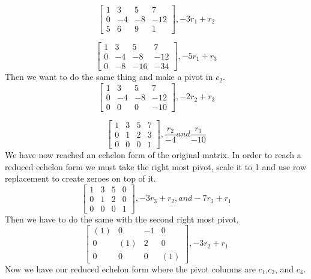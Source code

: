 \documentclass{amsart}
\begin{document}
\begin{equation}
\begin{bmatrix} 
1&3&5&7\\
0&-4&-8&-12\\
5&6&9&1
\end{bmatrix}, -3r_1+r_2
\end{equation}


\begin{equation}
\begin{bmatrix} 
1&3&5&7\\
0&-4&-8&-12\\
0&-8&-16&-34
\end{bmatrix}, -5r_1+r_3
\end{equation}
Then we want to do the same thing and make a pivot in $c_2$.
\begin{equation}
\begin{bmatrix} 
1&3&5&7\\
0&-4&-8&-12\\
0&0&0&-10
\end{bmatrix}, -2r_2+r_3
\end{equation}

\begin{equation}
\begin{bmatrix} 
1&3&5&7\\
0&1&2&3\\
0&0&0&1
\end{bmatrix},\frac{r_2}{-4} and \frac{r_3}{-10} 
\end{equation}
We have now reached an echelon form of the original matrix. In order to reach a reduced echelon form we must take the right most pivot, scale it to 1 and use row replacement to create zeroes on top of it. 
\begin{equation}
\begin{bmatrix} 
1&3&5&0\\
0&1&2&0\\
0&0&0&1
\end{bmatrix},-3r_3+r_2, and -7r_3+r_1 
\end{equation}
Then we have to do the same with the second right most pivot,
\begin{equation}
\begin{bmatrix} 
(1)&0&-1&0\\
0&(1)&2&0\\
0&0&0&(1)
\end{bmatrix},-3r_2+r_1 
\end{equation}
Now we have our reduced echelon form where the pivot columns are $c_1$,$c_2$, and $c_4$.
\end{document}
